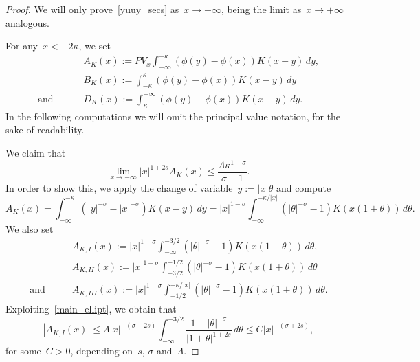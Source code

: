 \documentclass[10pt,a4paper]{amsart}
\numberwithin{equation}{section}
\begin{document}
\begin{proof}
We will only prove~\eqref{yuuy_secs} as~$x \to -\infty$, being
the limit as~$x\to +\infty$ analogous.

For any~$x<-2\kappa$, we set
\begin{equation}\label{52BIS}
\begin{split}
&A_K(x):= PV_x \int_{-\infty}^{-\kappa}\left( \phi(y)-\phi(x)\right) K(x-y)\, dy, \\ &B_K(x):= \int_{-\kappa}^{\kappa} \left( \phi(y) -\phi(x)\right) K(x-y) \, dy\\
{\mbox{and }}\qquad
&D_K(x):= \int_{\kappa}^{+\infty}\left( \phi(y)-\phi(x)\right) K(x-y)\, dy.
\end{split}
\end{equation}
In the following computations we will omit the principal value notation,
for the sake of readability.

We claim that 
\begin{equation}\label{x_secs}
\lim_{x \to -\infty} |x |^{1+2s} A_K(x) \leq  \frac{\Lambda\kappa^{1-\sigma}}{\sigma-1}.
\end{equation}
In order to show this, we apply the change of variable~$y:=|x|\theta$ and compute
\begin{equation*}
A_K(x) = \int_{-\infty}^{-\kappa} \left( | y |^{-\sigma} - |x |^{-\sigma} \right) K(x-y)\, dy 
= |x |^{1-\sigma} 
\int_{-\infty}^{-{\kappa}/{|x|}} \left( |\theta |^{-\sigma}-1\right) K\left( x (1+\theta)\right) \, d\theta.
\end{equation*}
We also set
\begin{equation}\label{53BIS}
\begin{split}
& A_{K,I}(x):= |x |^{1-\sigma} \int_{-\infty}^{-{3}/{2}}\left( |\theta |^{-\sigma}-1\right) K\left( x (1+\theta)\right) \, d\theta, \\
& A_{K,II}(x):=  |x |^{1-\sigma} 
\int_{-{3}/{2}}^{-{1}/{2}}\left(|\theta |^{-\sigma}-1\right) K\left( x (1+\theta)\right) \, d\theta \\ \mbox{and}\qquad
&A_{K,III}(x):=  | x |^{1-\sigma} \int_{-{1}/{2}}^{-{\kappa}/{| x|}}\left( | \theta |^{-\sigma}-1\right) K\left( x (1+\theta)\right) \, d\theta.
\end{split}
\end{equation}
Exploiting~\eqref{main_ellipt}, we obtain that
\begin{equation}\label{equno}
|A_{K,I}(x)| \leq \Lambda |x |^{-(\sigma+2s)}\int_{-\infty}^{-{3}/{2}}\frac{1- | \theta |^{-\sigma}}{| 1+\theta|^{1+2s}} \, d\theta \leq C |x |^{-(\sigma+2s)},
\end{equation}
for some~$C>0$, depending on~$s$, $\sigma$ and~$\Lambda$.


\end{proof}
\end{document}
